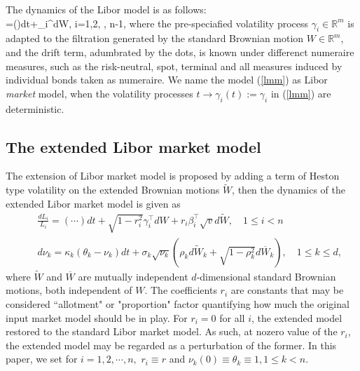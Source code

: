 \documentclass[12pt]{article}
\theoremstyle{definition}
\numberwithin{equation}{section} \theoremstyle{remark}
\begin{document}
The dynamics of the Libor model is as follows:\\
\beq\label{lmm}
=(\cdots)dt+\gamma_i^{\top}dW, \quad i=1,2, \cdots, n-1,
\nneq
where the pre-speciafied volatility process $\gamma_i\in \mathbb{R}^m$ is adapted to the filtration
generated by the standard Brownian motion $W\in \mathbb{R}^m$, and the drift term, adumbrated by the dots,
is known under differenct numeraire measures, such as the risk-neutral, spot, terminal and all measures
induced by individual bonds taken as numeraire. We name the model (\ref{lmm}) as Libor {\it{market}} model,
when the volatility processes $t\to\gamma_i(t):=\gamma_i$ in (\ref{lmm}) are deterministic.\\

\subsection{The extended Libor market model}
The extension of Libor market model is proposed by adding a term of Heston type volatility on the extended Brownian motions
$\widetilde{W}$, then the dynamics of the extended Libor market model is given as
\begin{eqnarray}
& &\frac{dL_i}{L_i}=(\cdots)dt+\sqrt{1-r_i^2}\gamma_i^{\top}dW+r_i\beta_i^{\top}\sqrt{v}d\widetilde{W}, \quad 1\leq i< n\label{exlmm}\\
\label{vola}& & d\nu_k=\kappa_k (\theta_k-\nu_k)dt+\sigma_k\sqrt{\nu_k}\left(\rho_kd\widetilde{W}_k+\sqrt{1-\rho_k^2}d\overline{W}_k\right), \quad 1\leq k\leq d,
\end{eqnarray}
where $\widetilde{W}$ and $\overline{W}$ are mutually independent $d$-dimensional standard Brownian motions, both independent of $W$.
The
coefficients $r_i$ are constants that may be considered ``allotment" or "proportion" factor quantifying how much the original input market model should be in play. For $r_i=0$ for all $i$, the extended model restored to the standard Libor market model. As such, at nozero value of the $r_i$, the extended model may be regarded as a perturbation of the former. In this paper, we set for $i=1,2,\cdots, n,$ $r_i\equiv r$ and $\nu_k(0)\equiv\theta_k\equiv 1, 1\leq k< n$. \\
\end{document}

